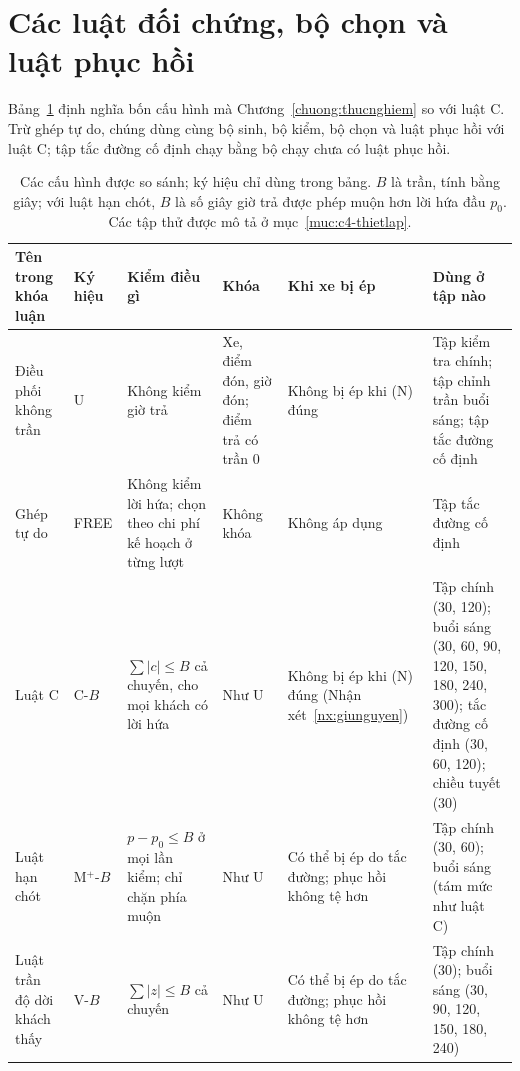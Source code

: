 \section{Các luật đối chứng, bộ chọn và luật phục hồi}
\label{muc:doichung}

Bảng~\ref{bang:luat} định nghĩa bốn cấu hình mà Chương~\ref{chuong:thucnghiem} so với luật C. Trừ ghép tự do,
chúng dùng cùng bộ sinh, bộ kiểm, bộ chọn và luật phục hồi với luật C; tập tắc đường cố định chạy bằng bộ chạy
chưa có luật phục hồi.

\begin{table}[htbp]
\centering
\caption{Các cấu hình được so sánh; ký hiệu chỉ dùng trong bảng. $B$ là trần, tính bằng giây; với luật hạn chót,
$B$ là số giây giờ trả được phép muộn hơn lời hứa đầu $p_0$. Các tập thử được mô tả ở mục~\ref{muc:c4-thietlap}.}
\label{bang:luat}
\footnotesize
\setlength{\tabcolsep}{3pt}
\begin{tabular}{@{}p{2.2cm}p{1.0cm}p{3.2cm}p{2.3cm}p{2.6cm}p{3.5cm}@{}}
\toprule
\textbf{Tên trong khóa luận} & \textbf{Ký hiệu} & \textbf{Kiểm điều gì} & \textbf{Khóa} & \textbf{Khi xe bị
ép} & \textbf{Dùng ở tập nào}\\
\midrule
Điều phối không trần & U & Không kiểm giờ trả & Xe, điểm đón, giờ đón; điểm trả có trần 0 & Không bị ép khi (N)
đúng & Tập kiểm tra chính; tập chỉnh trần buổi sáng; tập tắc đường cố định\\
Ghép tự do & FREE & Không kiểm lời hứa; chọn theo chi phí kế hoạch ở từng lượt & Không khóa & Không áp dụng &
Tập tắc đường cố định\\
Luật C & C-$B$ & $\sum |c| \le B$ cả chuyến, cho mọi khách có lời hứa & Như U & Không bị ép khi (N) đúng
(Nhận xét~\ref{nx:giunguyen}) & Tập chính (30, 120); buổi sáng (30, 60, 90, 120, 150, 180, 240, 300); tắc đường
cố định (30, 60, 120); chiều tuyết (30)\\
Luật hạn chót & M$^{+}$-$B$ & $p - p_0 \le B$ ở mọi lần kiểm; chỉ chặn phía muộn & Như U & Có thể bị ép do tắc
đường; phục hồi không tệ hơn & Tập chính (30, 60); buổi sáng (tám mức như luật C)\\
Luật trần độ dời khách thấy & V-$B$ & $\sum |z| \le B$ cả chuyến & Như U & Có thể bị ép do tắc đường; phục hồi
không tệ hơn & Tập chính (30); buổi sáng (30, 90, 120, 150, 180, 240)\\
\bottomrule
\end{tabular}
\end{table}

